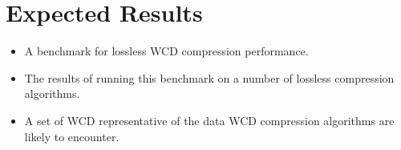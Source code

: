\chapter{Expected Results}

\begin{itemize}
\item A benchmark for lossless WCD compression performance.
\item The results of running this benchmark on a number of lossless compression algorithms.
\item A set of WCD representative of the data WCD compression algorithms are likely to encounter.
\end{itemize}
